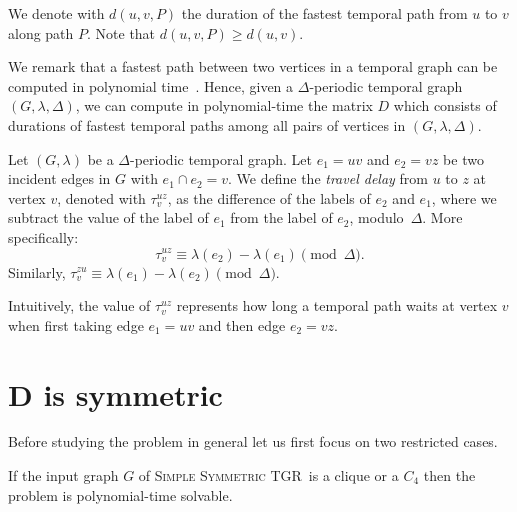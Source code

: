 \documentclass[a4paper,UKenglish,cleveref, autoref, thm-restate]{lipics-v2021}
\newcommand{\deltaSymExact}{\textsc{Simple Symmetric TGR}}
\begin{document}
We denote with $d(u,v,P)$ the duration of the fastest temporal path from $u$ to $v$ along path $P$. Note that $d(u,v,P) \geq d(u,v)$.

We remark that a fastest path between two vertices in a temporal graph can be computed in polynomial time~\cite{xuan_computing_2003,Wu2016Efficient}.
Hence, given a $\Delta$-periodic temporal graph $(G,\lambda,\Delta)$, we can compute in polynomial-time  the matrix $D$
which consists of durations of fastest temporal paths among all pairs of vertices in $(G,\lambda,\Delta)$.


\begin{definition} \label{def:travelDelays}
	Let $(G, \lambda)$ be a $\Delta$-periodic temporal graph.
	Let $e_1=uv$ and $e_2=vz$ be two incident edges in $G$ with $e_1 \cap e_2 = v$.
	We define the \emph{travel delay} from $u$ to $z$ at vertex $v$, denoted with $\tau_v^{uz}$,
	as the difference of the labels of $e_2$ and $e_1$, where we subtract the value of the label of $e_1$ from the label of $e_2$,  modulo~$\Delta$.
	More specifically:
	\begin{equation}\label{eq:def-VertexWaitingTime}
		\tau_v^{uz} \equiv \lambda (e_2) - \lambda(e_1) \pmod \Delta.
	\end{equation}
	Similarly, $\tau_v^{zu} \equiv \lambda (e_1) - \lambda(e_2) \pmod \Delta$.
\end{definition}
Intuitively, the value of $\tau_v^{uz}$ represents how long a temporal path waits at vertex $v$ when first taking edge $e_1=uv$ and then edge $e_2 = vz$.





\section{D is symmetric}
Before studying the problem in general let us first focus on two restricted cases.
\begin{theorem}
	If the input graph $G$ of \deltaSymExact\ is a clique or a $C_4$ then the problem is polynomial-time solvable. 
\end{theorem}
\end{document}
